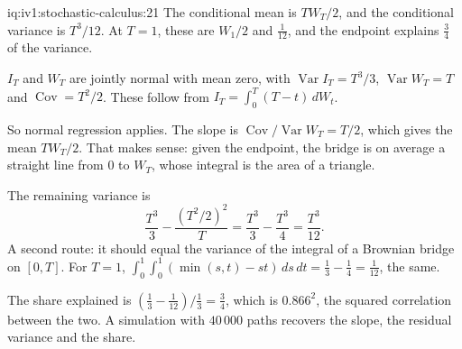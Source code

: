 \begin{solution}{iq:iv1:stochastic-calculus:21}
The conditional mean is $TW_T/2$, and the conditional variance is $T^3/12$. At $T = 1$, these are $W_1/2$ and $\frac{1}{12}$, and the endpoint explains $\frac34$ of the variance.

$I_T$ and $W_T$ are jointly normal with mean zero, with $\operatorname{Var}I_T = T^3/3$, $\operatorname{Var}W_T = T$ and $\operatorname{Cov} = T^2/2$. These follow from $I_T = \int_0^T(T - t)\,dW_t$.

So normal regression applies. The slope is $\operatorname{Cov}/\operatorname{Var}W_T = T/2$, which gives the mean $TW_T/2$. That makes sense: given the endpoint, the bridge is on average a straight line from 0 to $W_T$, whose integral is the area of a triangle.

The remaining variance is
\[
\frac{T^3}{3} - \frac{(T^2/2)^2}{T} = \frac{T^3}{3} - \frac{T^3}{4} = \frac{T^3}{12}.
\]
A second route: it should equal the variance of the integral of a Brownian bridge on $[0, T]$. For $T = 1$, $\int_0^1\int_0^1(\min(s, t) - st)\,ds\,dt = \frac13 - \frac14 = \frac{1}{12}$, the same.

The share explained is $(\frac13 - \frac{1}{12})/\frac13 = \frac34$, which is $0.866^2$, the squared correlation between the two. A simulation with $40\,000$ paths recovers the slope, the residual variance and the share.



\end{solution}

